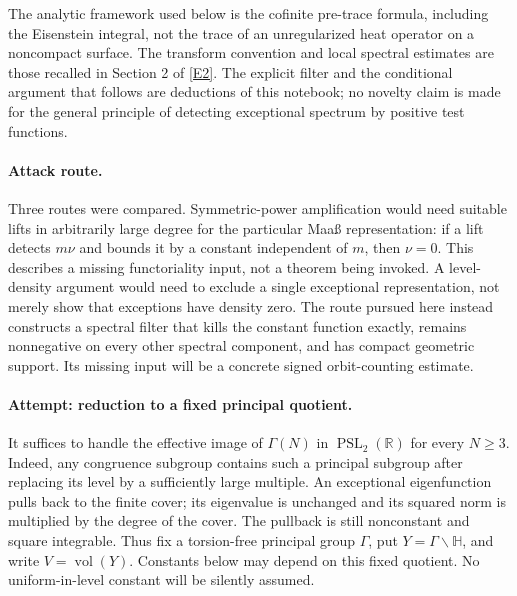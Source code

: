 \documentclass[11pt]{article}
\newcommand{\R}{\mathbb{R}}
\newcommand{\eref}[2]{\hyperlink{extra:#1:#2}{[E#2]}}
\begin{document}
The analytic framework used below is the cofinite pre-trace formula, including
the Eisenstein integral, not the trace of an unregularized heat operator on a
noncompact surface. The transform convention and local spectral estimates are
those recalled in Section 2 of \eref{statement}{2}. The explicit filter and the
conditional argument that follows are deductions of this notebook; no novelty
claim is made for the general principle of detecting exceptional spectrum by
positive test functions.

\paragraph{Attack route.}
Three routes were compared. Symmetric-power amplification would need suitable
lifts in arbitrarily large degree for the particular Maa\ss{} representation:
if a lift detects $m\nu$ and bounds it by a constant independent of $m$, then
$\nu=0$. This describes a missing functoriality input, not a theorem being
invoked. A level-density argument would need to exclude a single exceptional
representation, not merely show that exceptions have density zero. The route
pursued here instead constructs a spectral filter that kills the constant
function exactly, remains nonnegative on every other spectral component, and
has compact geometric support. Its missing input will be a concrete signed
orbit-counting estimate.

\paragraph{Attempt: reduction to a fixed principal quotient.}
It suffices to handle the effective image of $\Gamma(N)$ in
$\operatorname{PSL}_2(\R)$ for every $N\ge3$. Indeed, any congruence subgroup
contains such a principal subgroup after replacing its level by a sufficiently
large multiple. An exceptional eigenfunction pulls back to the finite cover;
its eigenvalue is unchanged and its squared norm is multiplied by the degree
of the cover. The pullback is still nonconstant and square integrable. Thus
fix a torsion-free principal group $\Gamma$, put
$Y=\Gamma\backslash\mathbb H$, and write $V=\operatorname{vol}(Y)$.
Constants below may depend on this fixed quotient. No uniform-in-level
constant will be silently assumed.
\end{document}
